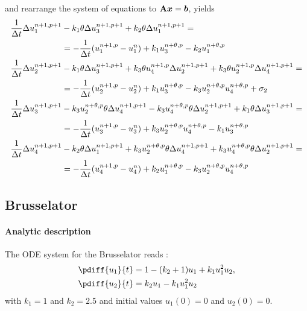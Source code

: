 and rearrange the system of equations to $\mbox{\boldmath ${\rm A}$}\bm{x}=\bm{b}$, yields
\begin{align}
    \frac{1}{\Delta t}\Delta u_1^{n+1, p+1} &  - k_1  \theta \Delta u_3^{n+1, p+1} + k_2  \theta \Delta u_1^{n+1, p+1}  =
    \nonumber \\*
    & = - \frac{1}{\Delta t}(u_1^{n+1,p} - u_1^n) + k_1 u_3^{n+\theta,p} - k_2 u_1^{n+\theta,p}
    \\
    \frac{1}{\Delta t}\Delta u_2^{n+1, p+1} & - k_1 \theta \Delta u_3^{n+1, p+1}
    + k_3 \theta u_4^{n+1,p} \Delta u_2^{n+1, p+1} + k_3 \theta u_2^{n+1,p} \Delta u_4^{n+1, p+1}  =
    \nonumber \\*
    & = - \frac{1}{\Delta t}(u_2^{n+1,p} - u_2^n) + k_1 u_3^{n+\theta,p} - k_3 u_2^{n+\theta,p} u_4^{n+\theta,p} +\sigma_2
    \\
    \frac{1}{\Delta t}\Delta u_3^{n+1, p+1} & - k_3 u_2^{n+\theta,p} \theta \Delta u_4^{n+1, p+1} - k_3 u_4^{n+\theta,p} \theta \Delta u_2^{n+1, p+1} + k_1 \theta \Delta u_3^{n+1, p+1}  =
    \nonumber \\*
    & = - \frac{1}{\Delta t}(u_3^{n+1,p} - u_3^n) + k_3 u_2^{n+\theta,p} u_4^{n+\theta,p} - k_1 u_3^{n+\theta,p}
    \\
    \frac{1}{\Delta t}\Delta u_4^{n+1, p+1}&  - k_2 \theta \Delta u_1^{n+1, p+1}  + k_3 u_2^{n+\theta,p}\theta \Delta u_4^{n+1, p+1} +k_3 u_4^{n+\theta,p} \theta \Delta u_2^{n+1, p+1} =
    \nonumber \\*
    & = - \frac{1}{\Delta t}(u_4^{n+1,p} - u_4^n) + k_2 u_1^{n+\theta,p} - k_3 u_2^{n+\theta,p} u_4^{n+\theta,p}
\end{align}
\subsection{Brusselator}\label{sec:brusselator}
\paragraph*{Analytic description}
The  ODE system for the Brusselator reads \citet[eq.\ 14,15]{AultHolmgreen2003}:
\begin{align}
    \pdiff{u_1}{t} & = 1 - (k_2 + 1) u_1 + k_1 u_1^2 u_2,
    \\
    \pdiff{u_2}{t} & = k_2 u_1 - k_1 u_1^2 u_2
    \label{eq:brusselator}
\end{align}
with $k_1 =1$ and  $k_2 = 2.5$ and initial values  $u_1(0)=0$ and $u_2(0) = 0$.
